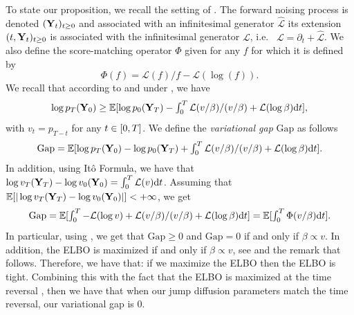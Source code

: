 To state our proposition, we recall the setting of
\cite{benton2022denoising}. The forward noising process is denoted
$(\mathbf{Y}_t)_{t \geq 0}$ and associated with an infinitesimal generator
$\hat{\mathcal{L}}$ its extension $(t, \mathbf{Y}_t)_{t \geq 0}$ is associated with
the infinitesimal generator $\mathcal{L}$, i.e.~
$\mathcal{L} = \partial_t + \hat{\mathcal{L}}$. We also define the
score-matching operator $\Phi$ given for any $f$ for which it is defined by
\begin{equation}
  \Phi(f) = \mathcal{L}(f)/f - \mathcal{L}(\log(f)) . 
\end{equation}
We recall that according to \cite[Equation (8)]{benton2022denoising} and under
\cite[Assumption 1, Assumption2]{benton2022denoising}, we have
\begin{equation}
 \textstyle \log p_T(\mathbf{Y}_0) \geq \mathbb{E}[\log p_0(\mathbf{Y}_T) - \int_0^T \mathcal{L}(v/\beta)/(v/\beta) + \mathcal{L}(\log \beta) \mathrm{d} t] ,
\end{equation}
with $v_t = p_{T-t}$ for any $t \in [ 0,T ]$. 
We define the \emph{variational gap} $\mathrm{Gap}$ as follows
\begin{equation}
  \mathrm{Gap} = \mathbb{E}[\textstyle \log p_T(\mathbf{Y}_0) - \log p_0(\mathbf{Y}_T) + \int_0^T \mathcal{L}(v/\beta)/(v/\beta) + \mathcal{L}(\log \beta) \mathrm{d} t] .
\end{equation}
In addition, using It\^o Formula, we have that $\log v_T(\mathbf{Y}_T) - \log v_0(\mathbf{Y}_0) = \int_0^T \mathcal{L}(v) \mathrm{d} t$.
Assuming that $\mathbb{E}[|\log v_T(\mathbf{Y}_T) - \log v_0(\mathbf{Y}_0)|] < +\infty$, we get
\begin{equation}
  \textstyle \mathrm{Gap} = \mathbb{E}[\int_0^T -\mathcal{L}(\log v) + \mathcal{L}(v/\beta)/(v/\beta) + \mathcal{L}(\log \beta) \mathrm{d} t] = \mathbb{E}[\int_0^T \Phi(v/\beta) \mathrm{d} t] . 
\end{equation}
In particular, using \cite[Proposition 1]{benton2022denoising}, we get that
$\mathrm{Gap} \geq 0$ and $\mathrm{Gap} = 0$ if and only if $\beta \propto
v$. In addition, the ELBO is maximized if and only if $\beta \propto v$, see
\cite[Equation 10]{benton2022denoising} and the remark that follows. Therefore,
we have that: if we maximize the ELBO then the ELBO is tight. Combining this with the fact that the ELBO is maximized at the time reversal \cite{benton2022denoising}, then we have that when our jump diffusion parameters match the time reversal, our variational gap is $0$.















